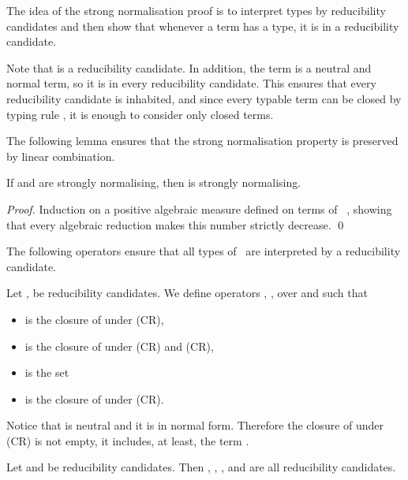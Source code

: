 The idea of the strong normalisation proof is to interpret types
by reducibility candidates and then show that whenever a term has a
type, it is in a reducibility candidate.

\begin{remark}
  Note that  is a reducibility candidate. In addition, the term  is a neutral and normal term, so it is in every reducibility candidate. This ensures that every reducibility candidate is inhabited, and since every typable term can be closed by typing rule , it is enough to consider only closed terms.
\end{remark}

The following lemma ensures that the strong normalisation property is
preserved by linear combination.

\begin{lemma}\label{lemmSNcloLC}
  If  and  are strongly normalising, then
   is strongly normalising.
\end{lemma}

\begin{proof} Induction on a positive algebraic measure defined on
  terms of ~\cite[Proposition 10]{ArrighiDowekRTA08}, showing that every
  algebraic reduction makes this number strictly decrease. \qed
\end{proof}

The following operators 
ensure that all types of \CA\ are interpreted by a reducibility
candidate.

\begin{definition}[Operators in ]\label{def:operatorsRC}
  Let ,  be reducibility candidates. We
  define operators , ,  over  and  such that

  \begin{itemize}
  \item  is the closure of
     under
    (CR),
  \item  is the closure of  under (CR) and (CR),
  \item  is the set 
  \item  is the closure of  under (CR).
  \end{itemize}
\end{definition}

\begin{remark}
Notice that  is neutral and it is in normal form. Therefore the closure of  under (CR) is not empty, it includes, at least, the term .
\end{remark}


\begin{lemma}\label{lemm:operatorsRC}
  Let  and  be reducibility candidates. Then
  , , ,  and 
  are all reducibility candidates.
\end{lemma}

